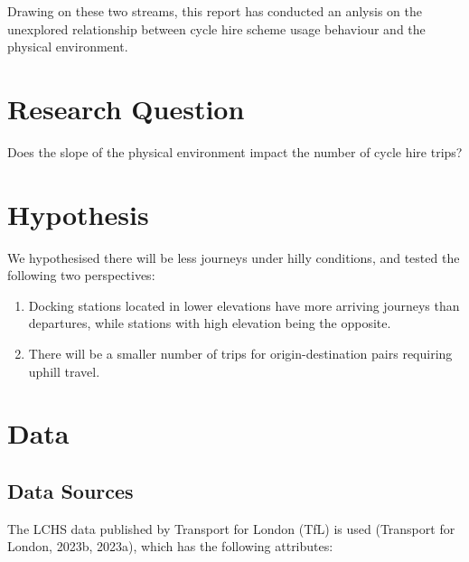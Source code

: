 \documentclass[
  12pt,
  a4paper,
  DIV=11,
  numbers=noendperiod]{scrartcl}
\providecommand{\tightlist}{%
  \setlength{\itemsep}{0pt}\setlength{\parskip}{0pt}}\usepackage{longtable,booktabs,array}
\begin{document}
Drawing on these two streams, this report has conducted an anlysis on
the unexplored relationship between cycle hire scheme usage behaviour
and the physical environment.

\hypertarget{research-question}{%
\section{Research Question}\label{research-question}}

Does the slope of the physical environment impact the number of cycle
hire trips?

\hypertarget{hypothesis}{%
\section{Hypothesis}\label{hypothesis}}

We hypothesised there will be less journeys under hilly conditions, and
tested the following two perspectives:

\begin{enumerate}
\def\labelenumi{\arabic{enumi}.}
\tightlist
\item
  Docking stations located in lower elevations have more arriving
  journeys than departures, while stations with high elevation being the
  opposite.
\item
  There will be a smaller number of trips for origin-destination pairs
  requiring uphill travel.
\end{enumerate}

\hypertarget{data}{%
\section{Data}\label{data}}

\hypertarget{data-sources}{%
\subsection{Data Sources}\label{data-sources}}

The LCHS data published by Transport for London (TfL) is used (Transport
for London, 2023b, 2023a), which has the following attributes:
\end{document}
